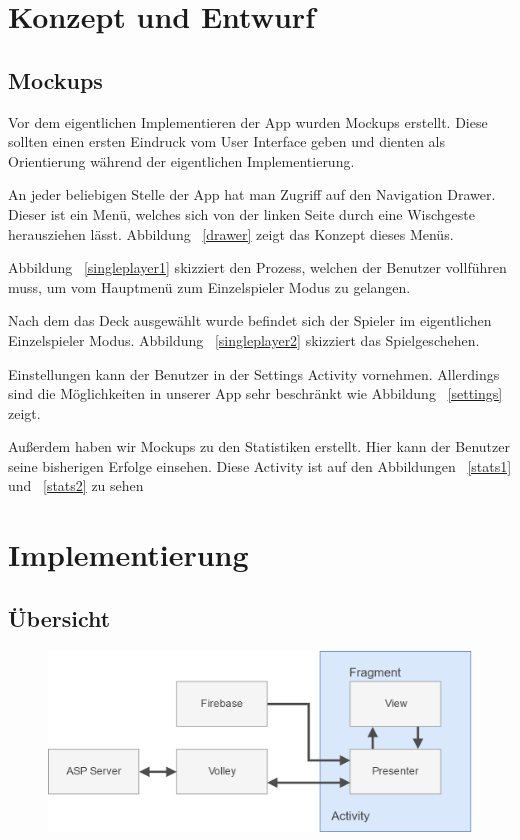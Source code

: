 \documentclass{scrartcl}
\begin{document}
\section{Konzept und Entwurf}
\subsection{Mockups}
Vor dem eigentlichen Implementieren der App wurden Mockups erstellt. Diese
sollten einen ersten Eindruck vom User Interface geben und dienten als
Orientierung während der eigentlichen Implementierung.

An jeder beliebigen Stelle der App hat man Zugriff auf den Navigation Drawer.
Dieser ist ein Menü, welches sich von der linken Seite durch eine Wischgeste
herausziehen lässt. Abbildung ~\ref{drawer} zeigt das Konzept dieses Menüs.

Abbildung ~\ref{singleplayer1} skizziert den Prozess, welchen der Benutzer
vollführen muss, um vom Hauptmenü zum Einzelspieler Modus zu gelangen.

Nach dem das Deck ausgewählt wurde befindet sich der Spieler im eigentlichen
Einzelspieler Modus. Abbildung ~\ref{singleplayer2} skizziert das
Spielgeschehen.

Einstellungen kann der Benutzer in der Settings Activity vornehmen. Allerdings
sind die Möglichkeiten in unserer App sehr beschränkt wie Abbildung
~\ref{settings} zeigt.

Außerdem haben wir Mockups zu den Statistiken erstellt. Hier kann der Benutzer
seine bisherigen Erfolge einsehen. Diese Activity ist auf den Abbildungen
~\ref{stats1} und ~\ref{stats2} zu sehen


\clearpage

\section{Implementierung}
\subsection{Übersicht}

\begin{figure}[h!tbp]
  \includegraphics[width=\textwidth]{img/architecture}
\end{figure}
\end{document}
